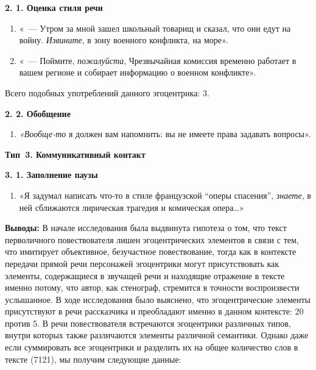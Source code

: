 \documentclass{kursa4}
\begin{document}
{{      \textbf{2. 1. Оценка стиля речи}
        \setcounter{saveenum}{\value{enumi}}
        \begin{enumerate}
        \setcounter{enumi}{\value{saveenum}}
        \item «~--- Утром за мной зашел школьный товарищ и сказал, что они едут на войну. \textit{Извините}, в зону военного конфликта, на море». 
        \item «~--- Поймите, \textit{пожалуйста}, Чрезвычайная комиссия временно работает в вашем регионе и собирает информацию о военном конфликте».
      \end{enumerate}

      Всего подобных употреблений данного эгоцентрика: 3.

      \textbf{2. 2. Обобщение}
      \setcounter{saveenum}{\value{enumi}}
        \begin{enumerate}
        \setcounter{enumi}{\value{saveenum}}
        \item \textit{«Вообще-то} я должен вам напомнить: вы не имеете права
        задавать вопросы».
      \end{enumerate}
      {\centering
      \textbf{Тип~3. Коммуникативный контакт }
      \par}

      \textbf{3. 1. Заполнение паузы}

      \setcounter{saveenum}{\value{enumi}}
        \begin{enumerate}
        \setcounter{enumi}{\value{saveenum}}
        \item «Я задумал написать что-то в стиле французской “оперы спасения”,
        \textit{знаете}, в ней сближаются лирическая трагедия и комическая
        опера…»
      \end{enumerate}

      \textbf{Выводы:}{
      В начале исследования была выдвинута гипотеза о том, что текст перволичного повествователя лишен эгоцентрических элементов в связи с тем, что имитирует объективное, безучастное повествование, тогда как в контексте передачи прямой речи персонажей эгоцентрики могут присутствовать как элементы, содержащиеся в звучащей речи и находящие отражение в тексте именно потому, что автор, как стенограф, стремится в точности воспроизвести услышанное. В ходе исследования было выяснено, что эгоцентрические элементы присутствуют в речи рассказчика и преобладают именно в данном контексте: 20 против 5. В речи повествователя встречаются эгоцентрики различных типов, внутри которых также различаются элементы различной семантики. Однако даже если суммировать все эгоцентрики и разделить их на общее количество слов в тексте (7121), мы получим следующие данные:}

}}
\end{document}
